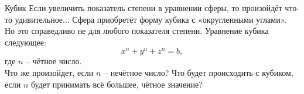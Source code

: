 \begin{surferPage}{Кубик}
Если увеличить показатель степени в уравнении сферы, то произойдёт что-то удивительное... Сфера приобретёт форму кубика с «округленными углами».\\
\vspace{0.3cm}
 Но это справедливо не для любого показателя степени. Уравнение кубика следующее:
\[x^n+y^n+z^n=b,\]
где $n$ – чётное число.\\
\vspace{0.3cm}
Что же произойдет, если $n$ – нечётное число? Что будет происходить с кубиком, если $n$ будет принимать всё большее, чётное значение?
\end{surferPage}
